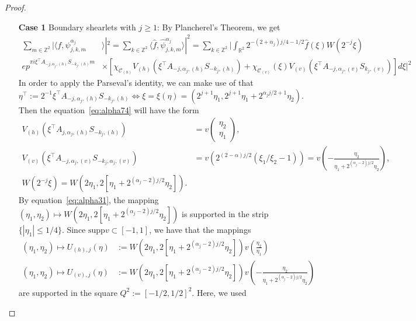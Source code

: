 \begin{proof}
\begin{itemize}
\begin{enumerate}
\item[\textbf{Case 1}] Boundary shearlets with $j\geq 1$: By Plancherel's Theorem, we get
\begin{equation}
\label{eq:alpha74}
\begin{aligned}
\sum_{m\in\mathbb{Z}^2} |\langle f,\psi_{j,k,m}^{\alpha_j}&\rangle|^2=\sum_{k\in\mathbb{Z}^2}\langle \hat{f},\hat{\psi}_{j,k,m}^{\alpha_j}\rangle |^2 =\sum_{k\in\mathbb{Z}^2}\bigg|\int_{\mathbb{R}^2}2^{-(2+\alpha_j)j/4-1/2}\hat{f}(\xi)W(2^{-j}\xi)\\
ep^{\pi i\xi^{\top}A_{-j,\alpha_j,(h)}S_{-k_j,(h)}m}&\times[\chi_{\mathcal{C}_{(h)}}V_{(h)}(\xi^{\top}A_{-j,\alpha_j,(h)}S_{-k_j,(h)})+\chi_{\mathcal{C}_{(v)}}(\xi)V_{(v)}(\xi^{\top}A_{-j,\alpha_j,(v)}S_{k_j,(v)})]d\xi\bigg|^2
\end{aligned}
\end{equation}
In order to apply the Parseval's identity, we can make use of that
$$
\eta^{\top}:=2^{-1}\xi^{\top}A_{-j,\alpha_{j},(h)}S_{-k_j,(h)}\Leftrightarrow \xi=\xi(\eta)=(2^{j+1}\eta_1,2^{j+1}\eta_1+2^{\alpha_j j/2+1}\eta_2).
$$
Then the equation~\ref{eq:alpha74} will have the form
$$
\begin{aligned}
V_{(h)}\left(\xi^{\top}A_{j,\alpha_j,(h)}S_{-k_j,(h)}\right)&=v\left(\begin{matrix}\eta_2\\ \eta_1\end{matrix}\right),\\
V_{(v)}\left(\xi^{\top}A_{-j,\alpha_j,(v)}S_{-k_j,\alpha_j,(v)}\right)&=v\left(2^{(2-\alpha)j/2}(\xi_1/\xi_2-1)\right) = v\left(-\frac{\eta_2}{\eta_1+2^{(\alpha_j-2)j/2}\eta_2}\right),\\
W(2^{-j}\xi)=W\left(2\eta_1,2[\eta_1+2^{(\alpha_j-2)j/2}\eta_2]\right).
\end{aligned}
$$
By equation~\ref{eq:alpha31}, the mapping $(\eta_1,\eta_2)\mapsto W(2\eta_1,2[\eta_1+2^{(\alpha_j-2)j/2}\eta_2])$ is supported in the strip $\{|\eta_1|\leq 1/4\}$. Since $\text{supp}v\subset [-1,1]$, we have that the mappings
$$
\begin{aligned}
(\eta_1,\eta_2)\mapsto U_{(h),j}(\eta)&:=W(2\eta_1,2[\eta_1+2^{(\alpha_j-2)j/2}\eta_2])v\left(\frac{\eta_2}{\eta_1}\right)\\
(\eta_1,\eta_2)\mapsto U_{(v),j}(\eta)&:=W(2\eta_1,2[\eta_1+2^{(\alpha_j-2)j/2}\eta_2])v\left(-\frac{\eta_2}{\eta_1+2^{(\alpha_j-2)j/2}\eta_2}\right)
\end{aligned}
$$
are supported in the square $Q^2:=[-1/2,1/2]^2$. Here, we used

\end{enumerate}
\end{itemize}
\end{proof}
